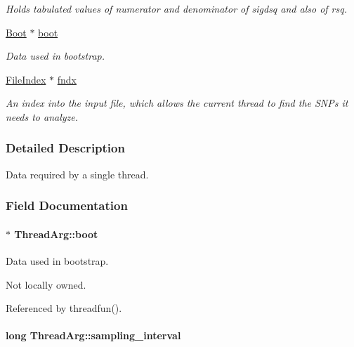 \begin{DoxyCompactItemize}
\begin{DoxyCompactList}\small\item\em Holds tabulated values of numerator and denominator of sigdsq and also of rsq. \end{DoxyCompactList}\item 
\hyperlink{struct_boot}{Boot} $\ast$ \hyperlink{struct_thread_arg_aab899376a7a5c492cec323d9e5728ac2}{boot}
\begin{DoxyCompactList}\small\item\em Data used in bootstrap. \end{DoxyCompactList}\item 
\hypertarget{struct_thread_arg_a28bf9b11f7f26d007a926ecce5d06e89}{\hyperlink{struct_file_index}{File\-Index} $\ast$ \hyperlink{struct_thread_arg_a28bf9b11f7f26d007a926ecce5d06e89}{fndx}}\label{struct_thread_arg_a28bf9b11f7f26d007a926ecce5d06e89}

\begin{DoxyCompactList}\small\item\em An index into the input file, which allows the current thread to find the S\-N\-Ps it needs to analyze. \end{DoxyCompactList}\end{DoxyCompactItemize}


\subsubsection{Detailed Description}
Data required by a single thread. 

\subsubsection{Field Documentation}
\hypertarget{struct_thread_arg_aab899376a7a5c492cec323d9e5728ac2}{
\paragraph[{boot}]{$\ast$ Thread\-Arg\-::boot}}\label{struct_thread_arg_aab899376a7a5c492cec323d9e5728ac2}


Data used in bootstrap. 

Not locally owned. 

Referenced by threadfun().

\hypertarget{struct_thread_arg_ac82e3148f3f1efd2ad66f235afd1f5e5}{
\paragraph[{sampling\-\_\-interval}]{\setlength{\rightskip}{0pt plus 5cm}long Thread\-Arg\-::sampling\-\_\-interval}}\label{struct_thread_arg_ac82e3148f3f1efd2ad66f235afd1f5e5}


